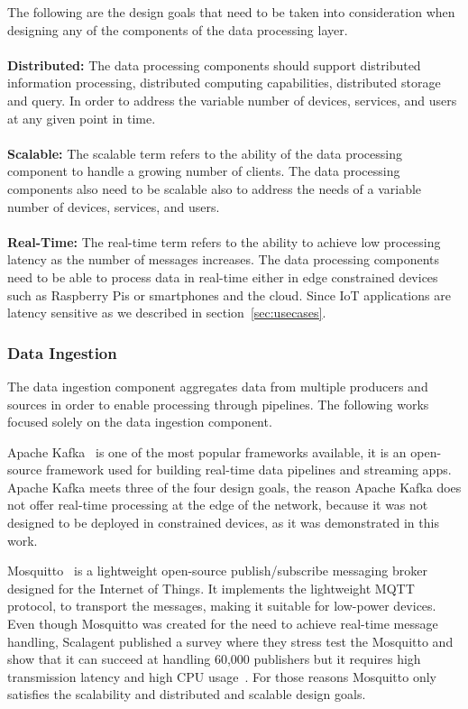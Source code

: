 The following are the design goals that need to be taken into consideration when designing any of the components of the data processing layer.
\\\\
\textbf{Distributed:} The data processing components should support distributed information processing, distributed computing capabilities, distributed storage and query. In order to address the variable number of devices, services, and users at any given point in time.
\\\\
\textbf{Scalable:} The scalable term refers to the ability of the data processing component to handle a growing number of
clients. The data processing components also need to be scalable also to address the needs of a variable number of devices, services, and users. 
\\\\
\textbf{Real-Time:} The real-time term refers to the ability to achieve low processing latency as the number of messages increases. The data processing components need to be able to process data in real-time either in edge constrained devices such as Raspberry Pis or smartphones and the cloud. Since IoT applications are latency sensitive as we described in section~\ref{sec:usecases}. 

\subsubsection{Data Ingestion}

The data ingestion component aggregates data from multiple producers and sources in order to enable processing through pipelines. The following works focused solely on the data ingestion component.

Apache Kafka~\cite{kafka} is one of the most popular frameworks available, it is an open-source framework used for building real-time data pipelines and streaming apps. Apache Kafka meets three of the four design goals, the reason Apache Kafka does not offer real-time processing at the edge of the network, because it was not designed to be deployed in constrained devices, as it was demonstrated in this work\cite{8778344}.

Mosquitto~\cite{mosquitto} is a lightweight open-source publish/subscribe messaging broker designed for the Internet of Things. It implements the lightweight MQTT protocol, to transport the messages, making it suitable for low-power devices. Even though Mosquitto was created for the need to achieve real-time message handling, Scalagent published a survey where they stress test the Mosquitto and show that it can succeed at handling 60,000 publishers but it requires high transmission latency and high CPU usage~\cite{mqtt}. For those reasons Mosquitto only satisfies the scalability and distributed and scalable design goals.

